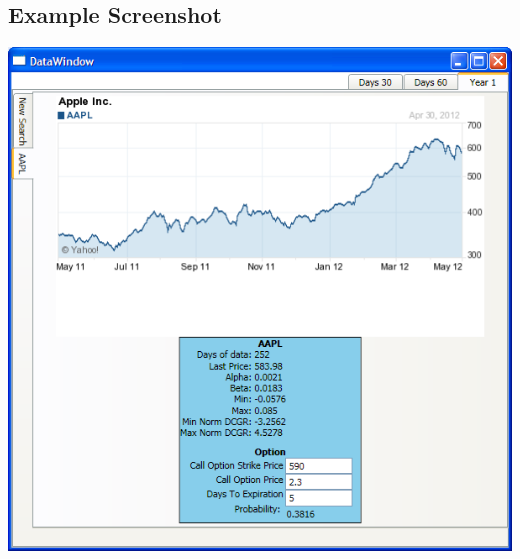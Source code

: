 \documentclass[pdftex,12pt]{article}
\theoremstyle{definition}
\theoremstyle{remark}
\begin{document}
\subsection*{Example Screenshot}
\begin{center}
 \includegraphics[scale=.6]{screenshot.png}
\end{center}
\end{document}
